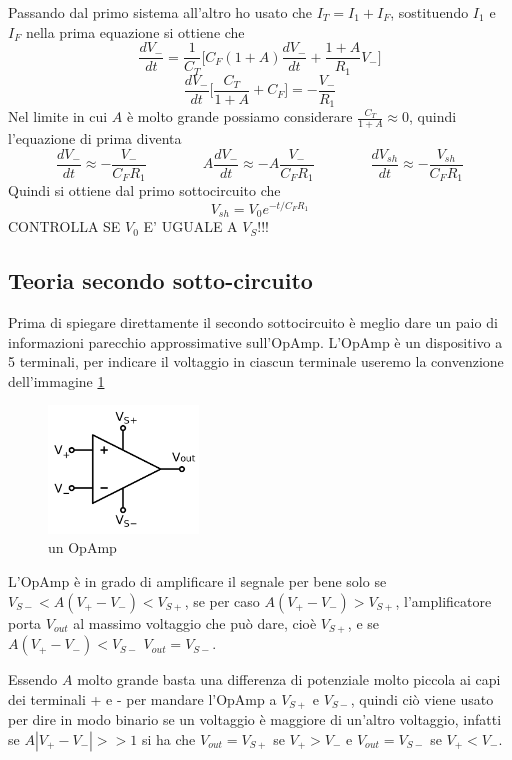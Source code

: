 \documentclass{article}
\begin{document}
			Passando dal primo sistema all'altro ho usato che $I_T=I_1+I_F$, sostituendo $I_1$ e $I_F$ nella prima equazione si ottiene che
			\[
				\frac{dV_-}{dt}=\frac{1}{C_T}\bigg[C_F(1+A)\frac{dV_-}{dt}+\frac{1+A}{R_1}V_-\bigg]
			\]
			\[
				\frac{dV_-}{dt}\bigg[\frac{C_T}{1+A}+C_F\bigg]=-\frac{V_-}{R_1}
			\]
			Nel limite in cui $A$ è molto grande possiamo considerare $\frac{C_T}{1+A}\approx0$, quindi l'equazione di prima diventa
			\[
				\frac{dV_-}{dt}\approx-\frac{V_-}{C_FR_1}\qquad\qquad
				A\frac{dV_-}{dt}\approx-A\frac{V_-}{C_FR_1}\qquad\qquad
				\frac{dV_{sh}}{dt}\approx-\frac{V_{sh}}{C_FR_1}
			\]
			Quindi si ottiene dal primo sottocircuito che\newline
			\begin{equation}
				V_{sh}=V_0e^{-t/C_FR_1}
			\end{equation}
			CONTROLLA SE $V_0$ E' UGUALE A $V_S$!!!
		\subsection{Teoria secondo sotto-circuito}
			Prima di spiegare direttamente il secondo sottocircuito è meglio dare un paio di informazioni parecchio approssimative sull'OpAmp.\newline
			L'OpAmp è un dispositivo a 5 terminali, per indicare il voltaggio in ciascun terminale useremo la convenzione dell'immagine \ref{fig:OpAmp1}\newline
			\begin{figure}
				\label{fig:OpAmp1}
				\centering
				\includegraphics[width=40mm]{immagini/OpAmp1.png}
				\caption{un OpAmp}
			\end{figure}
			L'OpAmp è in grado di amplificare il segnale per bene solo se $V_{S-}<A(V_+-V_-)<V_{S+}$, se per caso $A(V_+-V_-)>V_{S+}$, l'amplificatore porta $V_{out}$ al massimo voltaggio che può dare, cioè $V_{S+}$, e se $A(V_+-V_-)<V_{S-}$ $V_{out}=V_{S-}$.\newline

			Essendo $A$ molto grande basta una differenza di potenziale molto piccola ai capi dei terminali + e - per mandare l'OpAmp a $V_{S+}$ e $V_{S-}$, quindi ciò viene usato per dire in modo binario se un voltaggio è maggiore di un'altro voltaggio, infatti se $A|V_+-V_-|>>1$ si ha che $V_{out}=V_{S+}$ se $V_+>V_-$ e $V_{out}=V_{S-}$ se $V_+<V_-$.\newline
\end{document}
